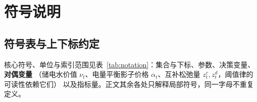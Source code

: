 
\section{符号说明}\label{chap:symbols}

\subsection{符号表与上下标约定}\label{sec:notation}

核心符号、单位与索引范围见表~\ref{tab:notation}：集合与下标、参数、决策变量、\textbf{对偶变量}
（储电水价值 \(\nu_t\)、电量平衡影子价格 \(\alpha_t\)、互补松弛量 \(z^c_t,z^d_t\)，阈值律的可读性依赖它们）
以及指标量。正文其余各处只解释局部符号，同一字母不重复定义。

